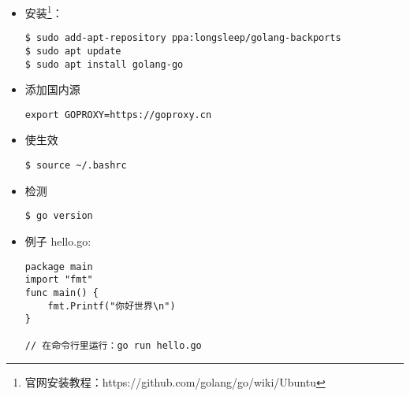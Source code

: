 \begin{itemize}
\item 安装\footnote{官网安装教程：https://github.com/golang/go/wiki/Ubuntu}：
\begin{lstlisting}
$ sudo add-apt-repository ppa:longsleep/golang-backports
$ sudo apt update
$ sudo apt install golang-go
\end{lstlisting}
	
\item 添加国内源
\begin{lstlisting}
export GOPROXY=https://goproxy.cn
\end{lstlisting}

\item 使生效
\begin{lstlisting}
$ source ~/.bashrc
\end{lstlisting}
	
\item 检测
\begin{lstlisting}
$ go version
\end{lstlisting}

\item 例子 hello.go: 

\begin{lstlisting}
package main
import "fmt" 
func main() {
	fmt.Printf("你好世界\n")
}

// 在命令行里运行：go run hello.go
\end{lstlisting}
\end{itemize}


